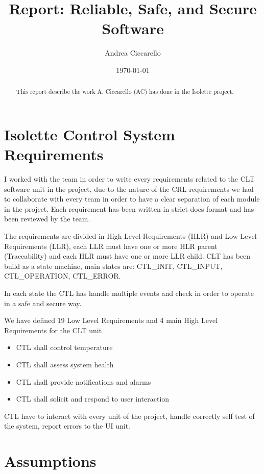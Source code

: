 \documentclass[a4paper, 12pt]{article}
\title{Report: Reliable, Safe, and Secure Software}
\author{Andrea Ciccarello}
\date{\today}
\begin{document}
\maketitle

\begin{abstract}
This report describe the work A. Ciccarello (AC) has done in the Isolette project.
\end{abstract}

\tableofcontents

\section{Isolette Control System Requirements}

I worked with the team in order to write every requirements related to the CLT software unit in the project,
due to the nature of the CRL requirements we had to collaborate with every team in order to have a clear
separation of each module in the project.
Each requirement has been written in strict docs format and has been reviewed by the team.

The requirements are divided in High Level Requirements (HLR) and Low Level Requirements (LLR),
each LLR must have one or more HLR parent (Traceability) and each HLR must have one or more LLR child.
CLT has been build as a state machine, main states are: CTL\_INIT, CTL\_INPUT, CTL\_OPERATION, CTL\_ERROR.

In each state the CTL has handle multiple events and check in order to operate in a safe and secure way.

We have defined 19 Low Level Requirements and 4 main High Level Requirements for the CLT unit

\begin{itemize}
    \item CTL shall control temperature
    \item CTL shall assess system health
    \item CTL shall provide notifications and alarms
    \item CTL shall solicit and respond to user interaction
\end{itemize}

CTL have to interact with every unit of the project, handle correctly self test of the system, report errors to the UI unit.

\section{Assumptions}
\end{document}

